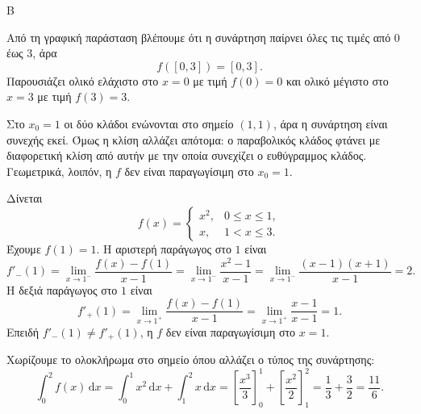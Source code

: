 \begin{thema}{Β}
\begin{erwthma}
\item Από τη γραφική παράσταση βλέπουμε ότι η συνάρτηση παίρνει όλες τις τιμές από $0$ έως $3$, άρα
\[
f([0,3])=[0,3].
\]
Παρουσιάζει ολικό ελάχιστο στο $x=0$ με τιμή $f(0)=0$ και ολικό μέγιστο στο $x=3$ με τιμή $f(3)=3$.

Στο $x_0=1$ οι δύο κλάδοι ενώνονται στο σημείο $(1,1)$, άρα η συνάρτηση είναι συνεχής εκεί. Όμως η κλίση αλλάζει απότομα: ο παραβολικός κλάδος φτάνει με διαφορετική κλίση από αυτήν με την οποία συνεχίζει ο ευθύγραμμος κλάδος. Γεωμετρικά, λοιπόν, η $f$ δεν είναι παραγωγίσιμη στο $x_0=1$.

\item Δίνεται
\[
f(x)=
\begin{cases}
x^2, & 0\leq x\leq 1,\\
x, & 1<x\leq 3.
\end{cases}
\]
Έχουμε $f(1)=1$. Η αριστερή παράγωγος στο $1$ είναι
\[
f'_-(1)=\lim_{x\to1^-}\frac{f(x)-f(1)}{x-1}
=\lim_{x\to1^-}\frac{x^2-1}{x-1}
=\lim_{x\to1^-}\frac{(x-1)(x+1)}{x-1}
=2.
\]
Η δεξιά παράγωγος στο $1$ είναι
\[
f'_+(1)=\lim_{x\to1^+}\frac{f(x)-f(1)}{x-1}
=\lim_{x\to1^+}\frac{x-1}{x-1}
=1.
\]
Επειδή $f'_-(1)\ne f'_+(1)$, η $f$ δεν είναι παραγωγίσιμη στο $x=1$.

\item Χωρίζουμε το ολοκλήρωμα στο σημείο όπου αλλάζει ο τύπος της συνάρτησης:
\[
\int_0^2 f(x)\,\mathrm{d}x
=\int_0^1 x^2\,\mathrm{d}x+\int_1^2 x\,\mathrm{d}x
=\left[\frac{x^3}{3}\right]_0^1+\left[\frac{x^2}{2}\right]_1^2
=\frac13+\frac32=\frac{11}{6}.
\]
\end{erwthma}
\end{thema}



